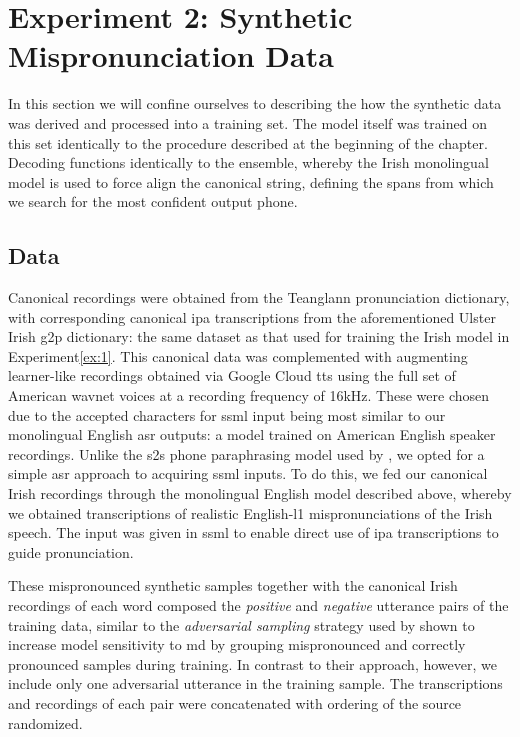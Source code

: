 \documentclass[thesis]{cluu}
\begin{document}
\section{Experiment 2: Synthetic Mispronunciation Data}\label{sec:e2}
In this section we will confine ourselves to describing the how the synthetic data was derived and processed into a training set. The model itself was trained on this set identically to the procedure described at the beginning of the chapter. Decoding functions identically to the ensemble, whereby the Irish monolingual model is used to force align the canonical string, defining the spans from which we search for the most confident output phone.

\subsection{Data} 
Canonical recordings were obtained from the Teanglann pronunciation dictionary, with corresponding canonical \gls{ipa} transcriptions from the aforementioned Ulster Irish \gls{g2p} dictionary: the same dataset as that used for training the Irish model in Experiment\ref{ex:1}. This canonical data was complemented with augmenting learner-like recordings obtained via Google Cloud \acrlong{tts} \parencite{googlecloudtts} using the full set of American wavnet \parencite{oordWaveNetGenerativeModel2016} voices at a recording frequency of 16kHz. These were chosen due to the accepted characters for \gls{ssml} input being most similar to our monolingual English \gls{asr} outputs: a model trained on American English speaker recordings. Unlike the \gls{s2s} phone paraphrasing model used by \textcite{zhangL2GENNeuralPhoneme2022}, we opted for a simple \gls{asr} approach to acquiring \gls{ssml} inputs. To do this, we fed our canonical Irish recordings through the monolingual English model described above, whereby we obtained transcriptions of realistic English-\gls{l1} mispronunciations of the Irish speech. The input was given in \gls{ssml} to enable direct use of \gls{ipa} transcriptions to guide pronunciation.

These mispronounced synthetic samples together with the canonical Irish recordings of each word composed the \textit{positive} and \textit{negative} utterance pairs of the training data, similar to the \textit{adversarial sampling} strategy used by \textcite{zhangL2GENNeuralPhoneme2022} shown to increase model sensitivity to \gls{md} by grouping mispronounced and correctly pronounced samples during training. In contrast to their approach, however, we include only one adversarial utterance in the training sample. The transcriptions and recordings of each pair were concatenated with ordering of the source randomized. 
\end{document}
